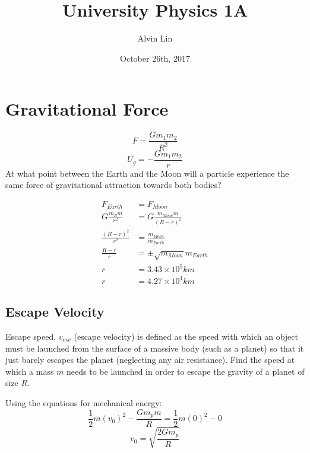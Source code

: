 \documentclass{math}
\title{University Physics 1A}
\author{Alvin Lin}
\date{October 26th, 2017}
\begin{document}
\maketitle

\section*{Gravitational Force}
\[ F = \frac{Gm_1m_2}{R^2} \]
\[ U_g = -\frac{Gm_1m_2}{r} \]
At what point between the Earth and the Moon will a particle experience the
same force of gravitational attraction towards both bodies?
\begin{center}
\end{center}
\begin{align*}
  F_{Earth} &= F_{Moon} \\
  G\frac{m_Em}{r^2} &= G\frac{m_{Moon}m}{(R-r)^2} \\
  \frac{(R-r)^2}{r^2} &= \frac{m_{Moon}}{m_{Earth}} \\
  \frac{R-r}{r} &= \pm\sqrt{m_{Moon}}{m_{Earth}} \\
  r &= 3.43\times10^5 km \\
  r &= 4.27\times10^4 km
\end{align*}

\subsection*{Escape Velocity}
Escape speed, \( v_{esc} \) (escape velocity) is defined as the speed with which
an object must be launched from the surface of a massive body (such as a planet)
so that it just barely escapes the planet (neglecting any air resistance). Find
the speed at which a mass \( m \) needs to be launched in order to escape the
gravity of a planet of size \( R \).
\begin{center}
\end{center}
Using the equations for mechanical energy:
\[ \frac{1}{2}m(v_0)^2-\frac{Gm_pm}{R} = \frac{1}{2}m(0)^2-0 \]
\[ v_0 = \sqrt{\frac{2Gm_p}{R}} \]
\end{document}
